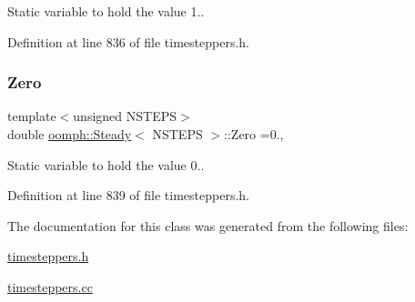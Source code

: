 Static variable to hold the value 1.. 



Definition at line 836 of file timesteppers.\+h.

\mbox{\label{classoomph_1_1Steady_aaafcc85863ac0695b273a98fd4525196}} 
\subsubsection{\texorpdfstring{Zero}{Zero}}
{\footnotesize\ttfamily template$<$unsigned N\+S\+T\+E\+PS$>$ \\
double \hyperlink{classoomph_1_1Steady}{oomph\+::\+Steady}$<$ N\+S\+T\+E\+PS $>$\+::Zero =0.\hspace{0.3cm}{\ttfamily [static]}, {\ttfamily [private]}}



Static variable to hold the value 0.. 



Definition at line 839 of file timesteppers.\+h.



The documentation for this class was generated from the following files\+:\begin{DoxyCompactItemize}
\item 
\hyperlink{timesteppers_8h}{timesteppers.\+h}\item 
\hyperlink{timesteppers_8cc}{timesteppers.\+cc}\end{DoxyCompactItemize}
